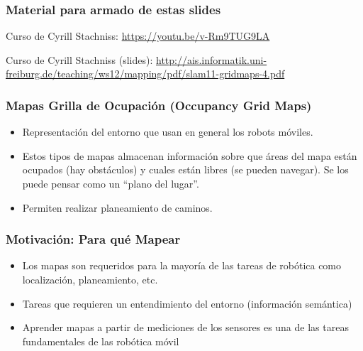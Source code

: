\begin{frame}
	\frametitle{Material para armado de estas slides}
	Curso de Cyrill Stachniss: \url{https://youtu.be/v-Rm9TUG9LA}

	Curso de Cyrill Stachniss (slides): \url{http://ais.informatik.uni-freiburg.de/teaching/ws12/mapping/pdf/slam11-gridmaps-4.pdf}
    

\end{frame}

\begin{frame}
    \frametitle{Mapas Grilla de Ocupación (Occupancy Grid Maps)}
    
    \begin{itemize}
    \item Representación del entorno que usan en general los robots móviles.
    \item Estos tipos de mapas almacenan información sobre que áreas del mapa están ocupados (hay obstáculos) y cuales están libres (se pueden navegar). Se los puede pensar como un ``plano del lugar''.
    \item Permiten realizar planeamiento de caminos.
    \end{itemize}
   
\end{frame}

\begin{frame}
    \frametitle{Motivación: Para qué Mapear}
    
    \begin{itemize}
        \item Los mapas son requeridos para la mayoría de las tareas de robótica como localización, planeamiento, etc.
        \item Tareas que requieren un entendimiento del entorno (información semántica)
        \item Aprender mapas a partir de mediciones de los sensores es una de las tareas fundamentales de las robótica móvil
    \end{itemize}
    
\end{frame}

